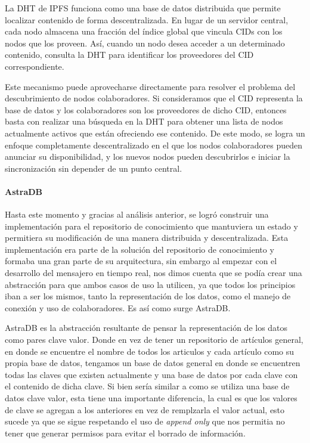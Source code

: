La DHT de IPFS funciona como una base de datos distribuida que permite localizar contenido de forma descentralizada. En lugar de un servidor central, cada nodo almacena una fracción del índice global que vincula CIDs con los nodos que los proveen. Así, cuando un nodo desea acceder a un determinado contenido, consulta la DHT para identificar los proveedores del CID correspondiente.\cite{dht}

Este mecanismo puede aprovecharse directamente para resolver el problema del descubrimiento de nodos colaboradores. Si consideramos que el CID representa la base de datos y los colaboradores son los proveedores de dicho CID, entonces basta con realizar una búsqueda en la DHT para obtener una lista de nodos actualmente activos que están ofreciendo ese contenido. De este modo, se logra un enfoque completamente descentralizado en el que los nodos colaboradores pueden anunciar su disponibilidad, y los nuevos nodos pueden descubrirlos e iniciar la sincronización sin depender de un punto central.

\paragraph{AstraDB}

Hasta este momento y gracias al análisis anterior, se logró construir una implementación para el repositorio de conocimiento que mantuviera un estado y permitiera su modificación de una manera distribuida y descentralizada. Esta implementación era parte de la solución del repositorio de conocimiento y formaba una gran parte de su arquitectura, sin embargo al empezar con el desarrollo del mensajero en tiempo real, nos dimos cuenta que se podía crear una abstracción para que ambos casos de uso la utilicen, ya que todos los principios iban a ser los mismos, tanto la representación de los datos, como el manejo de conexión y uso de colaboradores. Es así como surge AstraDB.

AstraDB es la abstracción resultante de pensar la representación de los datos como pares clave valor. Donde en vez de tener un repositorio de artículos general, en donde se encuentre el nombre de todos los articulos y cada artículo como su propia base de datos, tengamos un base de datos general en donde se encuentren todas las claves que existen actualmente y una base de datos por cada clave con el contenido de dicha clave. Si bien sería similar a como se utiliza una base de datos clave valor, esta tiene una importante diferencia, la cual es que los valores de clave se agregan a los anteriores en vez de remplzarla el valor actual, esto sucede ya que se sigue respetando el uso de \textit{append only} que nos permitia no tener que generar permisos para evitar el borrado de información.

